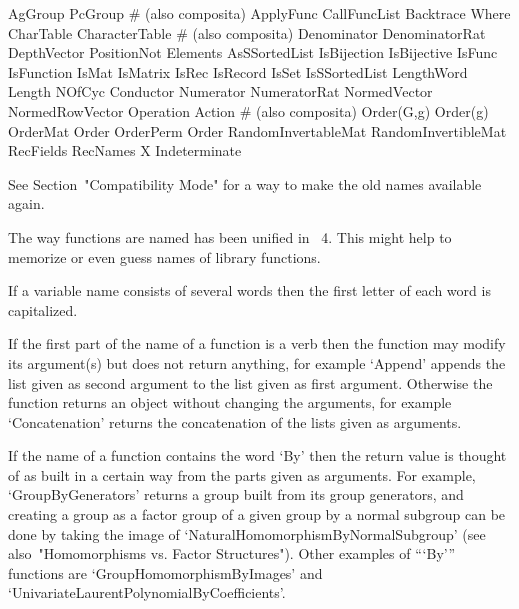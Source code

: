     AgGroup                 PcGroup            # (also composita)
    ApplyFunc               CallFuncList
    Backtrace               Where
    CharTable               CharacterTable     # (also composita)
    Denominator             DenominatorRat
    DepthVector             PositionNot
    Elements                AsSSortedList
    IsBijection             IsBijective
    IsFunc                  IsFunction
    IsMat                   IsMatrix
    IsRec                   IsRecord
    IsSet                   IsSSortedList
    LengthWord              Length
    NOfCyc                  Conductor
    Numerator               NumeratorRat
    NormedVector            NormedRowVector
    Operation               Action            # (also composita)
    Order(G,g)              Order(g)
    OrderMat                Order
    OrderPerm               Order
    RandomInvertableMat     RandomInvertibleMat
    RecFields               RecNames
    X                       Indeterminate
\endtt

See Section~"Compatibility Mode" for a way to make the old names
available again.



The way functions are named has been unified in {\GAP}~4.
This might help to memorize or even guess names of library functions.

If a variable name consists of several words then the first
letter of each word is capitalized.

If the first part of the name of a function is a verb then the function
may modify its argument(s) but does not return anything,
for example `Append' appends the list given as second argument to the
list given as first argument.
Otherwise the function returns an object without changing the arguments,
for example `Concatenation' returns the concatenation of the lists
given as arguments.

If the name of a function contains the word `By' then the return value is
thought of as built in a certain way from the parts given as arguments.
For example, `GroupByGenerators' returns a group built from its group
generators, and creating a group as a factor group of a given group
by a normal subgroup can be done by taking the image of
`NaturalHomomorphismByNormalSubgroup'
(see also~"Homomorphisms vs. Factor Structures").
Other examples of ```By''' functions are `GroupHomomorphismByImages' and
`UnivariateLaurentPolynomialByCoefficients'.

